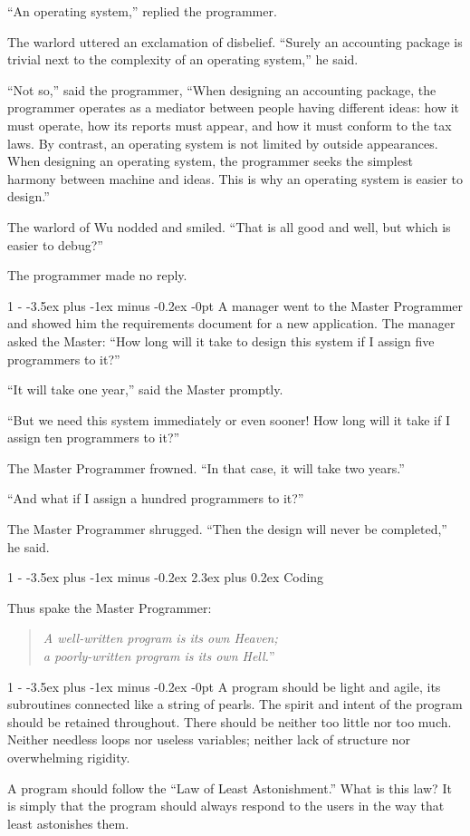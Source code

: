 \documentclass[12pt,letterpaper,titlepage]{article}
\makeatletter
\newlength{\intomargin}\setlength{\intomargin}{25pt}
\renewcommand{\section}{%
\@startsection{section}%
{1}%
{-\intomargin}%
{-3.5ex plus -1ex minus -0.2ex}%
{2.3ex plus 0.2ex}%
{\clearpage\normalfont\Large\bfseries}%
}
\renewcommand{\subsection}{%
\@startsection{subsection}%
{1}%
{-\intomargin}%
{-3.5ex plus -1ex minus -0.2ex}%
{-0pt}%
{\normalfont\normalsize\bfseries}%
}
\newcommand{\book}[2]{\section{#1}\par\hspace{-\intomargin}Thus spake the Master Programmer:%
\begin{quotation}\noindent\llap{``}\textsl{#2}''\end{quotation}\medskip}
\newcommand{\sect}{\subsection{}}
\makeatother
\begin{document}
``An operating system,'' replied the programmer.

The warlord uttered an exclamation of disbelief. ``Surely an
accounting package is trivial next to the complexity of an operating
system,'' he said.

``Not so,'' said the programmer, ``When designing an accounting
package, the programmer operates as a mediator between people having
different ideas: how it must operate, how its reports must appear, and
how it must conform to the tax laws. By contrast, an operating system
is not limited by outside appearances. When designing an operating
system, the programmer seeks the simplest harmony between machine and
ideas. This is why an operating system is easier to design.''

The warlord of Wu nodded and smiled. ``That is all good and well, but
which is easier to debug?''

The programmer made no reply.

\sect
A manager went to the Master Programmer and showed him the
requirements document for a new application. The manager asked the
Master: ``How long will it take to design this system if I assign five
programmers to it?''

``It will take one year,'' said the Master promptly.

``But we need this system immediately or even sooner! How long will it
take if I assign ten programmers to it?''

The Master Programmer frowned. ``In that case, it will take two years.''

``And what if I assign a hundred programmers to it?''

The Master Programmer shrugged. ``Then the design will never be
completed,'' he said.

\book{Coding}%
{A well-written program is its own Heaven;\\ a poorly-written
program is its own Hell.}

\sect
A program should be light and agile, its subroutines connected like a
string of pearls. The spirit and intent of the program should be
retained throughout. There should be neither too little nor too
much. Neither needless loops nor useless variables; neither lack of
structure nor overwhelming rigidity.

A program should follow the ``Law of Least Astonishment.'' What is
this law? It is simply that the program should always respond to the
users in the way that least astonishes them.
\end{document}
